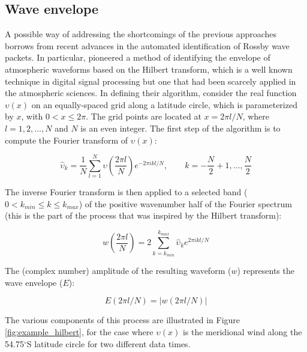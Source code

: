 \subsection{Wave envelope}

A possible way of addressing the shortcomings of the previous approaches borrows from recent advances in the automated identification of Rossby wave packets. In particular, \citet{Zimin2003} pioneered a method of identifying the envelope of atmospheric waveforms based on the Hilbert transform, which is a well known technique in digital signal processing but one that had been scarcely applied in the atmospheric sciences. In defining their algorithm, \citet{Zimin2003} consider the real function $\upsilon(x)$ on an equally-spaced grid along a latitude circle, which is parameterized by $x$, with $0 < x \leq 2\pi$. The grid points are located at $x = 2 \pi l / N$, where $l = 1, 2, \dotsc, N$ and $N$ is an even integer. The first step of the algorithm is to compute the Fourier transform of $\upsilon(x)$:

\begin{equation}\label{eq:fourier_transform}
\hat{\upsilon}_k = \frac{1}{N}\sum_{l=1}^N \upsilon \left( \frac{2 \pi l}{N} \right) e^{-2 \pi ikl/N},\qquad k = -\frac{N}{2} + 1, \dotsc, \frac{N}{2}
\end{equation}

\noindent The inverse Fourier transform is then applied to a selected band ($0 < k_{min} \leq k \leq k_{max}$) of the positive wavenumber half of the Fourier spectrum (this is the part of the process that was inspired by the Hilbert transform):

\begin{equation}\label{eq:inverse_transform}
w \left( \frac{2 \pi l}{N} \right) = 2 \sum_{k=k_{min}}^{k_{max}} \hat{\upsilon}_k e^{2\pi ikl/N}
\end{equation}

\noindent The (complex number) amplitude of the resulting waveform ($w$) represents the wave envelope ($E$):

\begin{equation}\label{eq:wave_envelope}
E(2 \pi l / N) = | w(2 \pi l / N) |
\end{equation}

\noindent The various components of this process are illustrated in Figure \ref{fig:example_hilbert}, for the case where $\upsilon(x)$ is the meridional wind along the 54.75$^{\circ}$S latitude circle for two different data times. 

